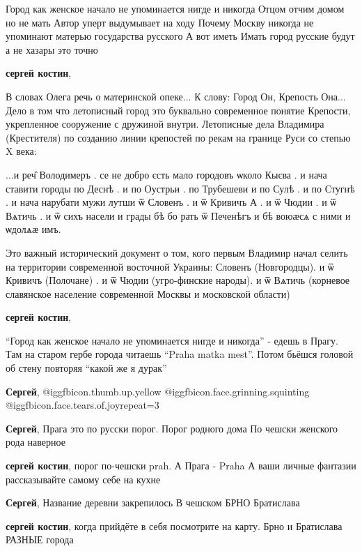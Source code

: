 \begin{itemize}

Город как женское начало не упоминается нигде и никогда Отцом отчим домом но не
мать Автор уперт выдумывает на ходу Почему Москву никогда не упоминают матерью
государства русского А вот иметь Имать город русские будут а не хазары это
точно

\begin{itemize} %
\textbf{сергей костин}, 

В словах Олега речь о материнской опеке... К слову: Город Он, Крепость
Она... Дело в том что летописный город это буквально современное понятие
Крепости, укрепленное сооружение с дружиной внутри. Летописные дела Владимира
(Крестителя) по созданию линии крепостей по рекам на границе Руси со степью X
века:

...и реч̑ Володимеръ . се не добро єсть мало городовъ ѡколо Кыєва . и нача
ставити городы по Деснѣ . и по Оустрьи . по Трубешеви и по Сулѣ . и по Стугнѣ .
и нача нарубати мужи лутши ѿ Словенъ . и ѿ Кривичъ А . и ѿ Чюдии . и ѿ Вѧтичь .
и ѿ сихъ насели и грады бѣ бо рать ѿ Печенѣгъ и бѣ воюӕсѧ с ними и ѡдолѧӕ имъ.

Это важный исторический документ о том, кого первым Владимир начал селить на
территории современной восточной Украины: Словенъ (Новгородцы). и ѿ Кривичъ
(Полочане) . и ѿ Чюдии (угро-финские народы). и ѿ Вѧтичь (корневое славянское
население современной Москвы и московской области)

\textbf{сергей костин},

\enquote{Город как женское начало не упоминается нигде и никогда} - едешь в Прагу. Там
на старом гербе города читаешь \enquote{Praha matka mest}. Потом бьёшся головой об
стену повторяя \enquote{какой же я дурак}

\textbf{Сергей},  @igg{fbicon.thumb.up.yellow}  @igg{fbicon.face.grinning.squinting}  @igg{fbicon.face.tears.of.joy}{repeat=3} 

\textbf{Сергей}, Прага это по русски порог. Порог родного дома По чешски женского рода наверное

\textbf{сергей костин}, порог по-чешски prah. А Прага - Praha
А ваши личные фантазии рассказывайте самому себе на кухне

\textbf{Сергей}, Название деревни закрепилось В чешском БРНО Братислава

\textbf{сергей костин}, когда прийдёте в себя посмотрите на карту. Брно и Братислава РАЗНЫЕ города


\end{itemize}
\end{itemize}
